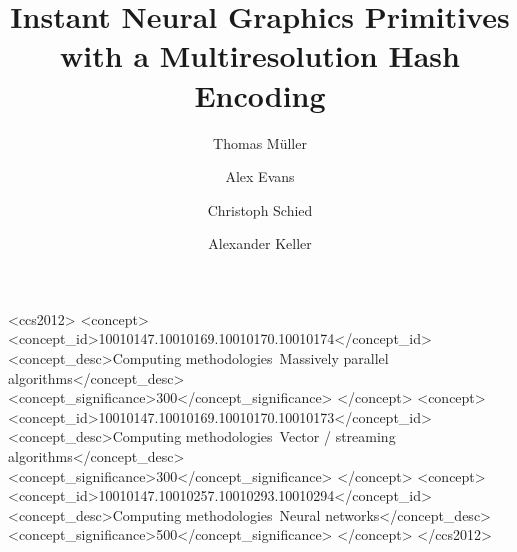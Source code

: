 \documentclass[acmtog,authorversion]{acmart}
\begin{document}
\title{Instant Neural Graphics Primitives with a Multiresolution Hash Encoding}

\author{Thomas M\"uller}

\author{Alex Evans}

\author{Christoph Schied}

\author{Alexander Keller}

\renewcommand\shortauthors{M\"uller et al.}

\begin{CCSXML}
<ccs2012>
   <concept>
       <concept_id>10010147.10010169.10010170.10010174</concept_id>
       <concept_desc>Computing methodologies~Massively parallel algorithms</concept_desc>
       <concept_significance>300</concept_significance>
       </concept>
   <concept>
       <concept_id>10010147.10010169.10010170.10010173</concept_id>
       <concept_desc>Computing methodologies~Vector / streaming algorithms</concept_desc>
       <concept_significance>300</concept_significance>
       </concept>
   <concept>
       <concept_id>10010147.10010257.10010293.10010294</concept_id>
       <concept_desc>Computing methodologies~Neural networks</concept_desc>
       <concept_significance>500</concept_significance>
       </concept>
 </ccs2012>
\end{CCSXML}


\end{document}
